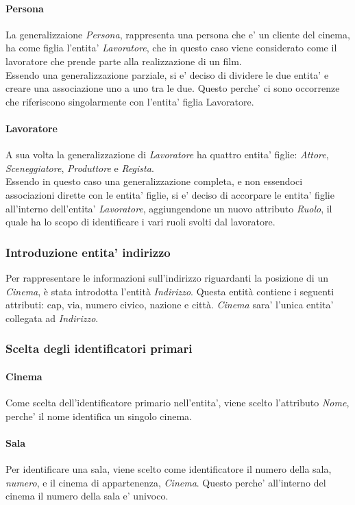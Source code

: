 \documentclass[10pt]{article}
\begin{document}
	\paragraph{Persona}
	La generalizzaione \textit{Persona}, rappresenta una persona che e' un cliente del cinema, ha come figlia l'entita' \textit{Lavoratore}, che in questo caso viene considerato come il lavoratore che prende parte alla realizzazione di un film.\\
	Essendo una generalizzazione parziale, si e' deciso di dividere le due entita' e creare una associazione uno a uno tra le due. Questo perche' ci sono occorrenze che riferiscono singolarmente con l'entita' figlia Lavoratore.\\
	\paragraph{Lavoratore}
	A sua volta la generalizzazione di \textit{Lavoratore} ha quattro entita' figlie: \textit{Attore}, \textit{Sceneggiatore}, \textit{Produttore} e \textit{Regista}.\\
	Essendo in questo caso una generalizzazione completa, e non essendoci associazioni dirette con le entita' figlie, si e' deciso di accorpare le entita' figlie all'interno dell'entita' \textit{Lavoratore}, aggiungendone un nuovo attributo \textit{Ruolo}, il quale ha lo scopo di identificare i vari ruoli svolti dal lavoratore.
	\subsubsection{Introduzione entita' indirizzo}
	Per rappresentare le informazioni sull’indirizzo riguardanti la posizione di un \textit{Cinema}, è stata introdotta l’entità \textit{Indirizzo}. Questa entità contiene i seguenti attributi: cap, via, numero civico, nazione e città. \textit{Cinema} sara' l'unica entita' collegata ad \textit{Indirizzo}.
	\subsubsection{Scelta degli identificatori primari}
	\paragraph{Cinema}
	Come scelta dell'identificatore primario nell'entita', viene scelto l'attributo \textit{Nome}, perche' il nome identifica un singolo cinema.
	\paragraph{Sala}
	Per identificare una sala, viene scelto come identificatore il numero della sala, \textit{numero}, e il cinema di appartenenza, \textit{Cinema}. Questo perche' all'interno del cinema il numero della sala e' univoco.
\end{document}
